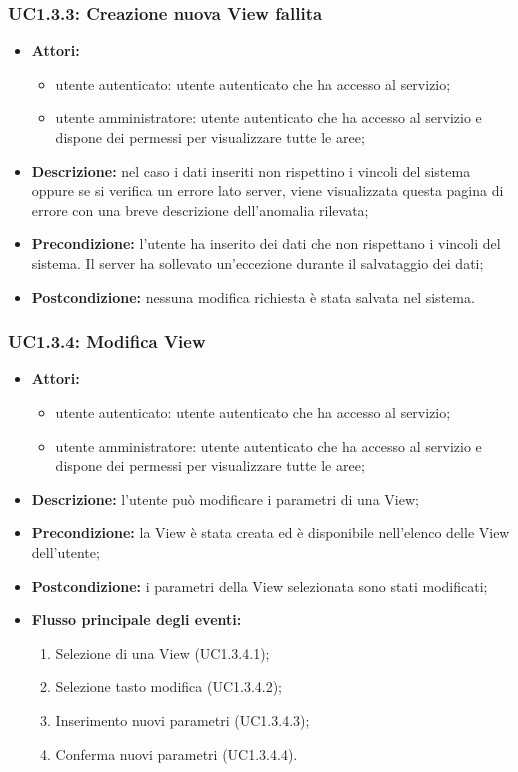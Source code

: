 \subsubsection{UC1.3.3: Creazione nuova View fallita}

\begin{itemize}
   	\item \textbf{Attori:}
    \begin{itemize}
    	\item utente autenticato: utente autenticato che ha accesso al servizio;
    	\item utente amministratore: utente autenticato che ha accesso al servizio e dispone dei permessi per visualizzare tutte le aree;
	\end{itemize}
    \item \textbf{Descrizione:} nel caso i dati inseriti non rispettino i vincoli del sistema oppure se si verifica un errore lato server, viene visualizzata questa pagina di errore con una breve descrizione dell'anomalia rilevata;
    \item \textbf{Precondizione:} l'utente ha inserito dei dati che non rispettano i vincoli del sistema. Il server ha sollevato un'eccezione durante il salvataggio dei dati;
    \item \textbf{Postcondizione:} nessuna modifica richiesta è stata salvata nel sistema.
\end{itemize}

\subsubsection{UC1.3.4: Modifica View}

\begin{itemize}
   	\item \textbf{Attori:}
    \begin{itemize}
    	\item utente autenticato: utente autenticato che ha accesso al servizio;
    	\item utente amministratore: utente autenticato che ha accesso al servizio e dispone dei permessi per visualizzare tutte le aree;
	\end{itemize}
    \item \textbf{Descrizione:} l'utente può modificare i parametri di una View\gloss{};
    \item \textbf{Precondizione:} la View\gloss{} è stata creata ed è disponibile nell'elenco delle View dell'utente;
    \item \textbf{Postcondizione:} i parametri della View\gloss{} selezionata sono stati modificati;
	\item \textbf{Flusso principale degli eventi:}
    \begin{enumerate}
        \item Selezione di una View\gloss{} (UC1.3.4.1);
        \item Selezione tasto modifica (UC1.3.4.2);
        \item Inserimento nuovi parametri (UC1.3.4.3);
        \item Conferma nuovi parametri (UC1.3.4.4).
    \end{enumerate}
\end{itemize}

